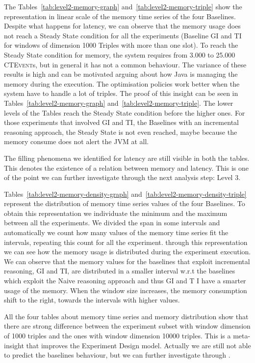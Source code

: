 The Tables~\ref{tab:level2-memory-graph} and~\ref{tab:level2-memory-triple} show the representation in linear scale of the memory time series of the four Baselines. Despite what happens for latency, we can observe that the memory usage does not reach a Steady State condition for all the experiments (Baseline GI and TI for windows of dimension 1000 Triples with more than one slot).  To reach the Steady State condition for memory, the system requires from 3.000 to 25.000 \textsc{CTEvent}s, but in general it has not a common behaviour. The variance of these results is high and can be motivated arguing about how Java is managing the memory during the execution. The optimisation policies work better when the system have to handle a lot of triples. The proof of this insight can be seen in Tables~\ref{tab:level2-memory-graph} and~\ref{tab:level2-memory-triple}. The lower levels of the Tables reach the Steady State condition before the higher ones. For those experiments that involved GI and TI, the Baselines with an incremental reasoning approach, the Steady State is not even reached, maybe because the memory consume does not alert the JVM at all. 

The filling phenomena we identified for latency are still visible in both the tables. This denotes the existence of a relation between memory and latency. This is one of the point we can further investigate through the next analysis step: Level 3.

Tables~\ref{tab:level2-memory-density-graph} and~\ref{tab:level2-memory-density-triple} represent the distribution of memory time series values of the four Baselines. To obtain this representation we individuate the minimum and the maximum between all the experiments. We divided the span in some intervals and automatically we count how many values of the memory time series fit the intervals, repeating this count for all the experiment. through this representation we can see how the memory usage is distributed during the experiment execution. We can observe that the memory values for the baselines that exploit incremental reasoning, GI and TI, are distributed in a smaller interval w.r.t the baselines which exploit the Naive reasoning approach and thus GI and T I have a smarter usage of the memory. When the window size increases, the memory consumption shift to the right, towards the intervals with higher values.

All the four tables about memory time series and memory distribution show that there are strong difference between the experiment subset with window dimension of 1000  triples and the ones with window dimension 10000 triples. This is a meta-insight that improves the Experiment Design model. Actually we are still not able to predict the baselines behaviour, but we can further investigate through \namens.

